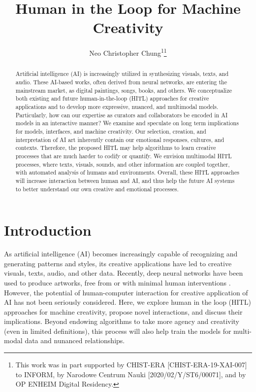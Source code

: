 \documentclass[letterpaper]{article} %
\title{Human in the Loop for Machine Creativity}
\author{
Neo Christopher Chung\textsuperscript{\rm 1}\thanks{This work was in part supported by CHIST-ERA [CHIST-ERA-19-XAI-007] to INFORM, by Narodowe Centrum Nauki [2020/02/Y/ST6/00071], and by OP ENHEIM Digital Residency.}
\\
}
\begin{document}
\maketitle

\begin{abstract}
Artificial intelligence (AI) is increasingly utilized in synthesizing visuals, texts, and audio. These AI-based works, often derived from neural networks, are entering the mainstream market, as digital paintings, songs, books, and others. We conceptualize both existing and future human-in-the-loop (HITL) approaches for creative applications and to develop more expressive, nuanced, and multimodal models. Particularly, how can our expertise as curators and collaborators be encoded in AI models in an interactive manner? We examine and speculate on long term implications for models, interfaces, and machine creativity. Our selection, creation, and interpretation of AI art inherently contain our emotional responses, cultures, and contexts. Therefore, the proposed HITL may help algorithms to learn creative processes that are much harder to codify or quantify. We envision multimodal HITL processes, where texts, visuals, sounds, and other information are coupled together, with automated analysis of humans and environments. Overall, these HITL approaches will increase interaction between human and AI, and thus help the future AI systems to better understand our own creative and emotional processes.
\end{abstract}

\section{Introduction}
\label{introduction}
As artificial intelligence (AI) becomes increasingly capable of recognizing and generating patterns and styles, its creative applications have led to creative visuals, texts, audio, and other data. Recently, deep neural networks have been used to produce artworks, free from or with minimal human interventions \cite{Gatys2016, Elgammal2017, GANEdmondBelamy}. However, the potential of human-computer interaction for creative application of AI has not been seriously considered. Here, we explore human in the loop (HITL) approaches for machine creativity, propose novel interactions, and discuss their implications. Beyond endowing algorithms to take more agency and creativity (even in limited definitions), this process will also help train the models for multi-modal data and nunanced relationships.
\end{document}
